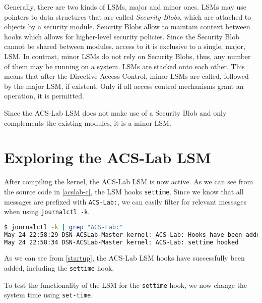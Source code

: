 \documentclass{semdoc}
\begin{document}
Generally, there are two kinds of LSMs, major and minor ones.
LSMs may use pointers to data structures that are called \emph{Security Blobs}, which are attached to objects by a security module.
Seucrity Blobs allow to maintain context between hooks which allows for higher-level security policies. 
Since the Security Blob cannot be shared between modules, access to it is exclusive to a single, major, LSM.
In contrast, minor LSMs do not rely on Security Blobs, thus, any number of them may be running on a system. 
LSMs are stacked onto each other. This means that after the Directive Access Control, minor LSMs are called, followed by the major LSM, if existent. Only if all access control mechanisms grant an operation, it is permitted.
\cite{Sautereau2017} 

Since the ACS-Lab LSM does not make use of a Security Blob and only complements the existing modules, it is a minor LSM. 

\section{Exploring the ACS-Lab LSM}

After compiling the kernel, the ACS-Lab LSM is now active. 
As we can see from the source code in \cref{acslab-c}, the LSM hooks \texttt{settime}. 
Since we know that all messages are prefixed with \texttt{ACS-Lab:}, we can easily filter for relevant messages when using \texttt{journalctl -k}.

\begin{lstlisting}[language=bash, caption={ACS-Lab kernel logs after startup}, label={startup}]
$ journalctl -k | grep "ACS-Lab:"
May 24 22:58:29 DSN-ACSLab-Master kernel: ACS-Lab: Hooks have been added!
May 24 22:58:34 DSN-ACSLab-Master kernel: ACS-Lab: settime hooked
\end{lstlisting}

As we can see from \cref{startup}, the ACS-Lab LSM hooks have successfully been added, including the \texttt{settime} hook. 

To test the functionality of the LSM for the \texttt{settime} hook, we now change the system time using \texttt{set-time}.
\end{document}
